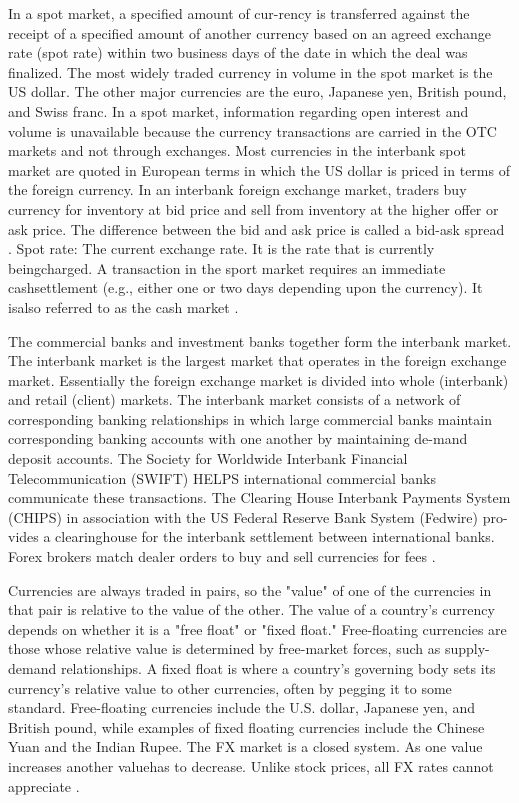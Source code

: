 In a spot market, a specified amount of cur-rency is transferred against the receipt of a specified amount of another currency based on an agreed exchange rate (spot rate) within two business days of the date in which the deal was finalized. The most widely traded currency in volume in the spot market is the US dollar. The other major currencies are the euro, Japanese yen, British pound, and Swiss franc. In a spot market, information regarding open interest and volume is unavailable because the currency transactions are carried in the OTC markets and not through exchanges. Most currencies in the interbank spot market are quoted in European terms in  which  the  US  dollar  is  priced  in  terms  of  the  foreign  currency.  In  an  interbank  foreign  exchange  market, traders buy currency for inventory at bid price and sell from inventory at the higher offer or ask price. The difference between the bid and ask price is called a bid-ask spread \cite{book_forex}.
Spot rate: The current exchange rate. It is the rate that is currently beingcharged. A transaction in the sport market requires an immediate cashsettlement (e.g., either one or two days depending upon the currency). It isalso referred to as the cash market \cite{book_forex_3}.

The commercial banks and investment banks together form the interbank market. The interbank market is the largest market that operates in the foreign exchange market.  Essentially  the  foreign  exchange  market  is  divided  into  whole  (interbank)  and  retail  (client)  markets. The interbank market consists of a network of corresponding banking relationships in which large commercial banks maintain corresponding banking accounts with one another by maintaining de-mand deposit accounts. The Society for Worldwide Interbank Financial Telecommunication (SWIFT) HELPS international commercial banks communicate these transactions. The Clearing House Interbank Payments System (CHIPS) in association with the US Federal Reserve Bank System (Fedwire) pro-vides a clearinghouse for the interbank settlement between international banks. Forex brokers match dealer orders to buy and sell currencies for fees \cite{book_forex}.

Currencies are always traded in pairs, so the "value" of one of the currencies in that pair is relative to the value of the other.
The value of a country's currency depends on whether it is a "free float" or "fixed float." Free-floating currencies are those whose relative value is determined by free-market forces, such as supply-demand relationships. A fixed float is where a country's governing body sets its currency's relative value to other currencies, often by pegging it to some standard. Free-floating currencies include the U.S. dollar, Japanese yen, and British pound, while examples of fixed floating currencies include the Chinese Yuan and the Indian Rupee.
The FX market is a closed system. As one value increases another valuehas to decrease. Unlike stock prices, all FX rates cannot appreciate \cite{book_forex_3}.


